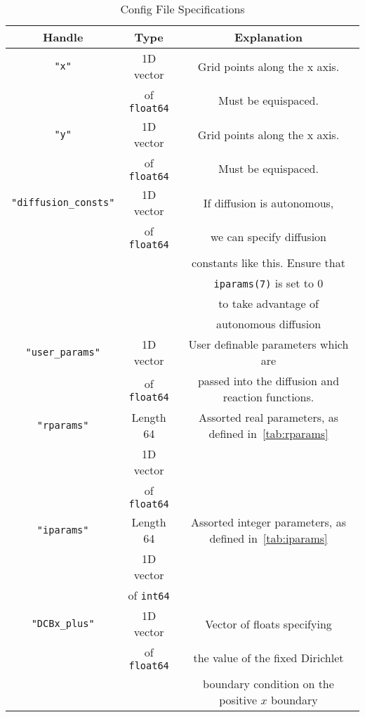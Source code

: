 \documentclass[11pt]{article}
\begin{document}
    \begin{table}
        \centering
        \caption{Config File Specifications}
        \label{tab:config}
        \begin{tabular}{c | c | c}
            Handle & Type & Explanation\\
            \hline
            \texttt{"x"} & 1D vector  & Grid points along the x axis. \\
            & of \texttt{float64} &  Must be equispaced.\\
            \hline
            \texttt{"y"} & 1D vector  & Grid points along the x axis. \\
            & of \texttt{float64} &  Must be equispaced.\\
            \hline
            \texttt{"diffusion\_consts"} & 1D vector  & If diffusion is autonomous, \\
            & of \texttt{float64} & we can specify diffusion\\
            & & constants like this. Ensure that\\
            & & \texttt{iparams(7)} is set to 0 \\
            & & to take advantage of\\
            & & autonomous diffusion\\
            \hline
            \texttt{"user\_params"} & 1D vector  & User definable parameters which are \\
            & of \texttt{float64} &  passed into the diffusion and reaction functions.\\
            \hline
            \texttt{"rparams"} & Length 64 & Assorted real parameters, as defined in~\ref{tab:rparams}\\
            & 1D vector & \\
            & of \texttt{float64} & \\
            \hline
            \texttt{"iparams"} & Length 64 & Assorted integer parameters, as defined in~\ref{tab:iparams}\\
            & 1D vector & \\
            & of \texttt{int64} & \\
            \hline
            \texttt{"DCBx\_plus"} & 1D vector & Vector of floats specifying \\
            & of \texttt{float64} & the value of the fixed Dirichlet \\
            & & boundary condition on the positive \(x\) boundary \\

\end{tabular}
\end{table}
\end{document}
